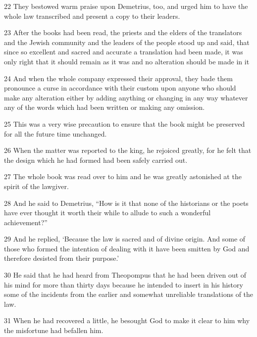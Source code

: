 \par 22 They bestowed warm praise upon Demetrius, too, and urged him to have the whole law transcribed and present a copy to their leaders.

\par 23 After the books had been read, the priests and the elders of the translators and the Jewish community and the leaders of the people stood up and said, that since so excellent and sacred and accurate a translation had been made, it was only right that it should remain as it was and no alteration should be made in it

\par 24 And when the whole company expressed their approval, they bade them pronounce a curse in accordance with their custom upon anyone who should make any alteration either by adding anything or changing in any way whatever any of the words which had been written or making any omission.

\par 25 This was a very wise precaution to ensure that the book might be preserved for all the future time unchanged.

\par 26 When the matter was reported to the king, he rejoiced greatly, for he felt that the design which he had formed had been safely carried out.

\par 27 The whole book was read over to him and he was greatly astonished at the spirit of the lawgiver.

\par 28 And he said to Demetrius, “How is it that none of the historians or the poets have ever thought it worth their while to allude to such a wonderful achievement?”

\par 29 And he replied, ‘Because the law is sacred and of divine origin. And some of those who formed the intention of dealing with it have been smitten by God and therefore desisted from their purpose.’

\par 30 He said that he had heard from Theopompus that he had been driven out of his mind for more than thirty days because he intended to insert in his history some of the incidents from the earlier and somewhat unreliable translations of the law.

\par 31 When he had recovered a little, he besought God to make it clear to him why the misfortune had befallen him.


